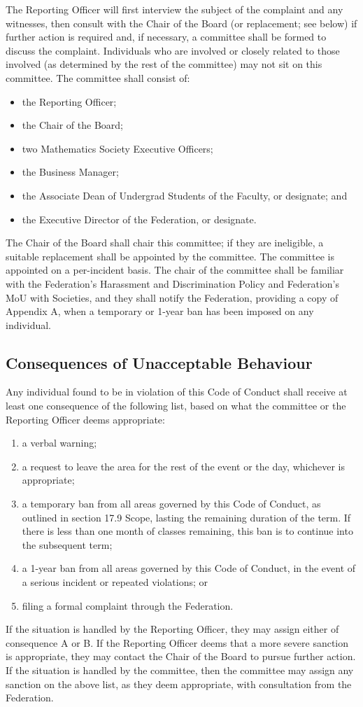 The Reporting Officer will first interview the subject of the complaint and any witnesses, then consult with the Chair of the Board (or replacement; see below) if further action is required and, if necessary, a committee shall be formed to discuss the complaint. Individuals who are involved or closely related to those involved (as determined by the rest of the committee) may not sit on this committee. The committee shall consist of:
\begin{itemize}
	\item the Reporting Officer;
	\item the Chair of the Board;
	\item two Mathematics Society Executive Officers;
	\item the Business Manager;
	\item the Associate Dean of Undergrad Students of the Faculty, or designate; and
	\item the Executive Director of the Federation, or designate.
\end{itemize}
The Chair of the Board shall chair this committee; if they are ineligible, a suitable replacement shall be appointed by the committee. The committee is appointed on a per-incident basis. The chair of the committee shall be familiar with the Federation's Harassment and Discrimination Policy and Federation's MoU with Societies, and they shall notify the Federation, providing a copy of Appendix A, when a temporary or 1-year ban has been imposed on any individual.

\subsection{Consequences of Unacceptable Behaviour}
Any individual found to be in violation of this Code of Conduct shall receive at least one consequence of the following list, based on what the committee or the Reporting Officer deems appropriate:
\begin{enumerate}[label=\Alph*.]
	\item a verbal warning;
	\item a request to leave the area for the rest of the event or the day, whichever is appropriate;
	\item a temporary ban from all areas governed by this Code of Conduct, as outlined in section 17.9 Scope, lasting the remaining duration of the term. If there is less than one month of classes remaining, this ban is to continue into the subsequent term;
	\item a 1-year ban from all areas governed by this Code of Conduct, in the event of a serious incident or repeated violations; or
	\item filing a formal complaint through the Federation.
\end{enumerate}
If the situation is handled by the Reporting Officer, they may assign either of consequence A or B. If the Reporting Officer deems that a more severe sanction is appropriate, they may contact the Chair of the Board to pursue further action. If the situation is handled by the committee, then the committee may assign any sanction on the above list, as they deem appropriate, with consultation from the Federation.

